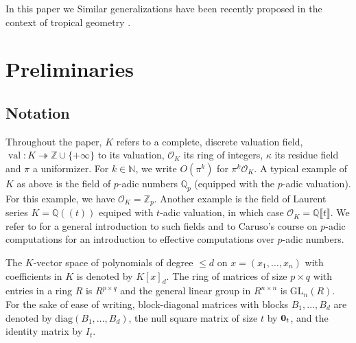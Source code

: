 \documentclass[a4paper,12pt]{article}
\newcommand{\N}{\mathbb{N}} %
\DeclareMathOperator{\val}{val}
\def\QQ{\ensuremath{\mathbb{Q}}}
\def\ZZ{\ensuremath{\mathbb{Z}}}
\newcommand{\OK}{\mathcal{O}_K}
\def\diag{\mathrm{diag}}
\newcommand{\GL}{\mathrm{GL}}
\begin{document}
In this paper we 
Similar generalizations have been recently proposed in the context of tropical geometry \cite{iriarte2022polyhedral}.



\section{Preliminaries}





\subsection{Notation}

Throughout the paper, $K$ refers to a complete,
discrete valuation field, $\val : K \twoheadrightarrow \ZZ \cup \{+\infty\}$ to its valuation,
$\OK$ its ring of integers, $\kappa$ its residue field and $\pi$ a uniformizer.
For $k \in \N$, we write $O(\pi^k)$ for $\pi^k \OK$.
A typical example of $K$ as above is the field of $p$-adic numbers 
$\QQ_p$ (equipped with the $p$-adic valuation). For this example, we 
have $\OK = \ZZ_p$.
Another example is the field of Laurent series
$K=\QQ(\!(t)\!)$ equiped with $t$-adic valuation,
in which case $\OK = \QQ \llbracket t \rrbracket$.
We refer to \cite{Serre:1979} for a
general introduction to such fields
and to Caruso's course on $p$-adic computations \cite{caruso_computations_2017}
for an introduction to effective computations over $p$-adic numbers.

The $K$-vector space of polynomials of degree $\leq d$ on $x=(x_1,\ldots,x_n)$
with coefficients in $K$ is denoted by $K[x]_{d}$. The ring of matrices of
size $p \times q$ with entries in a ring $R$ is $R^{p \times q}$ and the general
linear group in $R^{n \times n}$ is $\GL_n(R)$.
For the sake of ease of writing, block-diagonal matrices with blocks
$B_1,\ldots,B_d$ are denoted by $\diag(B_1, \ldots, B_d)$, the null square
matrix of size $t$ by ${\bf 0}_{t}$, and the identity matrix by $I_t$.
\end{document}
